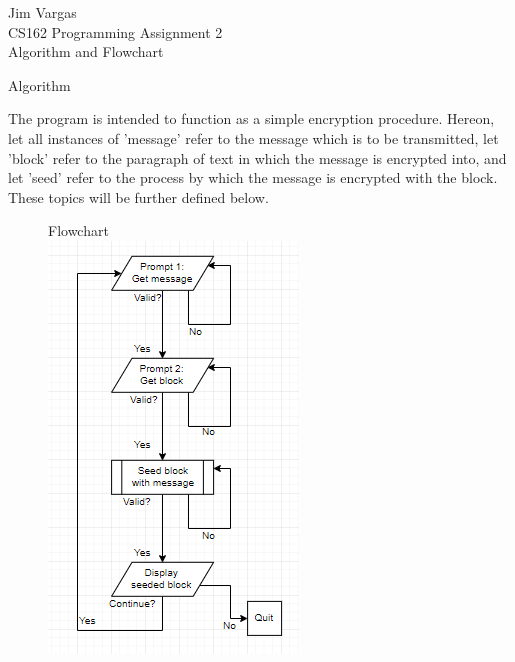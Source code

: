 \documentclass[12]{article}
\begin{document}
\onehalfspacing
\noindent
Jim Vargas\\
CS162 Programming Assignment 2\\
Algorithm and Flowchart
\begin{center}
Algorithm
\end{center}

	The program is intended to function as a simple encryption procedure. Hereon, let all instances of 'message' refer to the message which is to be transmitted, let 'block' refer to the paragraph of text in which the message is encrypted into, and let 'seed' refer to the process by which the message is encrypted with the block. These topics will be further defined below.
	

\begin{figure}
Flowchart\\
\centering
\includegraphics[scale=1]{flowchart.PNG}\\
\end{figure}
\end{document}
